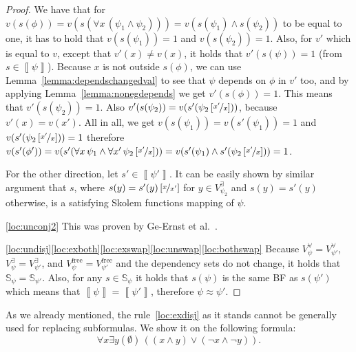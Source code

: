 \documentclass[
  digital, %
  color,
  twoside, %
  table,   %
  nolof,     %
  nolot,     %
]{fithesis3}
\theoremstyle{definition}
\theoremstyle{remark}
\newcommand{\seman}[1]{\left\llbracket {#1} \right\rrbracket}
\newcommand{\substitute}[2]{\left[ \nicefrac{#2}{#1} \right]}
\newcommand{\evars}[1]{V_{#1}^{\exists}}
\newcommand{\uvars}[1]{V_{#1}^{\forall}}
\newcommand{\fvars}[1]{V_{#1}^{\mathrm{free}}}
\newcommand{\Scands}[1]{\mathbb{S}_{#1}}
\newcommand{\itholds}{\,}
\begin{document}
\begin{proof}
  We have that for $v(s(\phi)) = v(s(\forall x \itholds (\psi_1 \land \psi_2))) = v(s(\psi_1) \land s(\psi_2))$ to be equal to one, it has to hold that $v(s(\psi_1)) = 1$ and $v(s(\psi_2)) = 1$. Also, for $v'$ which is equal to $v$, except that $v'(x) \not= v(x)$, it holds that $v'(s(\psi)) = 1$ (from $s \in \seman{\psi}$). Because $x$ is not outside $s(\phi)$, we can use Lemma~\ref{lemma:dependschangedval} to see that $\psi$ depends on $\phi$ in $v'$ too, and by applying Lemma~\ref{lemma:nonegdepends} we get $v'(s(\phi)) = 1$.
  This means that $v'(s(\psi_2)) = 1$. Also $v'(s(\psi_2)) = v(s'(\psi_2\substitute{x}{x'}))$, because $v'(x) = v(x')$. All in all, we get $v(s(\psi_1)) = v(s'(\psi_1)) = 1$ and $v(s'(\psi_2\substitute{x}{x'})) = 1$ therefore $v(s'(\phi')) = v(s'(\forall x \itholds \psi_1 \land \forall x' \itholds \psi_2\substitute{x}{x'})) = v(s'(\psi_1) \land s'(\psi_2\substitute{x}{x'})) = 1$.
  
  For the other direction, let $s' \in \seman{\psi'}$. It can be easily shown by similar argument that $s$, where $s(y) = s'(y)\substitute{x'}{x}$ for $y \in \evars{\psi_2}$ and $s(y) = s'(y)$ otherwise, is a satisfying Skolem functions mapping of $\psi$.
  
  \eqref{loc:unconj2} This was proven by Ge-Ernst et al.~\cite[Theorem 4]{HQSquantifierLocalisation}.
  
  \eqref{loc:undisj}\eqref{loc:exboth}\eqref{loc:exswap}\eqref{loc:unswap}\eqref{loc:bothswap} Because $\uvars{\psi} = \uvars{\psi'}$, $\evars{\psi} = \evars{\psi'}$, and $\fvars{\psi} = \fvars{\psi'}$ and the dependency sets do not change, it holds that $\Scands{\psi} = \Scands{\psi'}$. Also, for any $s \in \Scands{\psi}$ it holds that $s(\psi)$ is the same BF as $s(\psi')$ which means that $\seman{\psi} = \seman{\psi'}$, therefore $\psi \approx \psi'$.
\end{proof}

As we already mentioned, the rule~\eqref{loc:exdisj} as it stands cannot be generally used for replacing subformulas. We show it on the following formula:
\[\forall x \exists y(\emptyset) \itholds ((x \land y) \lor (\neg x \land \neg y)).\]
\end{document}
